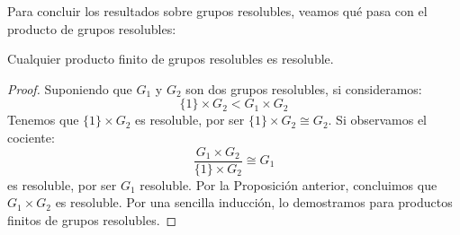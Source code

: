 \noindent
Para concluir los resultados sobre grupos resolubles, veamos qué pasa con el producto de grupos resolubles:

\begin{coro}
    Cualquier producto finito de grupos resolubles es resoluble.
    \begin{proof}
        Suponiendo que $G_1$ y $G_2$ son dos grupos resolubles, si consideramos:
        \begin{equation*}
            \{1\} \times G_2 < G_1\times G_2
        \end{equation*}
        Tenemos que $\{1\}\times G_2$ es resoluble, por ser $\{1\}\times G_2\cong G_2$. Si observamos el cociente:
        \begin{equation*}
            \dfrac{G_1\times G_2}{\{1\}\times G_2} \cong G_1
        \end{equation*}
        es resoluble, por ser $G_1$ resoluble. Por la Proposición anterior, concluimos que $G_1\times G_2$ es resoluble. Por una sencilla inducción, lo demostramos para productos finitos de grupos resolubles.
    \end{proof}
\end{coro}
